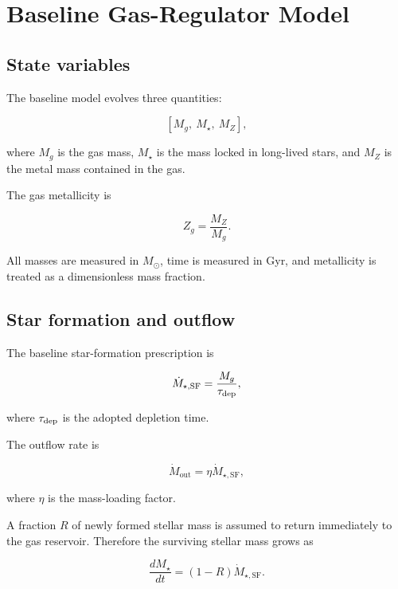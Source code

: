 \documentclass[10pt,a4paper]{article}
\newcommand{\SFR}{\dot{M}_{\star,\mathrm{SF}}}
\newcommand{\Mgout}{\dot{M}_{\mathrm{out}}}
\begin{document}
\section{Baseline Gas-Regulator Model}

\subsection{State variables}

The baseline model evolves three quantities:

\begin{equation}
\left[M_g,\ M_\star,\ M_Z\right],
\end{equation}

where \(M_g\) is the gas mass, \(M_\star\) is the mass locked in long-lived stars, and \(M_Z\) is the metal mass contained in the gas.

The gas metallicity is

\begin{equation}
Z_g=\frac{M_Z}{M_g}.
\end{equation}

All masses are measured in \(M_\odot\), time is measured in Gyr, and metallicity is treated as a dimensionless mass fraction.

\subsection{Star formation and outflow}

The baseline star-formation prescription is

\begin{equation}
\SFR=\frac{M_g}{\tau_{\rm dep}},
\label{eq:baseline_sfr}
\end{equation}

where \(\tau_{\rm dep}\) is the adopted depletion time.

The outflow rate is

\begin{equation}
\Mgout=\eta\SFR,
\end{equation}

where \(\eta\) is the mass-loading factor.

A fraction \(R\) of newly formed stellar mass is assumed to return immediately to the gas reservoir. Therefore the surviving stellar mass grows as

\begin{equation}
\frac{dM_\star}{dt}
=
(1-R)\SFR.
\label{eq:stellar_growth}
\end{equation}
\end{document}
